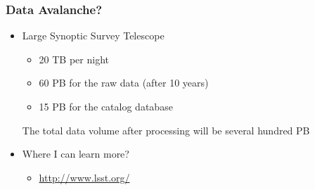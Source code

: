 \documentclass[fleqn]{beamer}
\begin{document}
  \begin{frame}\frametitle{Data Avalanche?}
  \begin{itemize}
    \item{Large Synoptic Survey Telescope}
      \begin{itemize}
        \item 20 TB per night
        \item 60 PB for the raw data (after 10 years)
        \item 15 PB for the catalog database
        

      \end{itemize}



        \small{The total data volume after processing will be
        several hundred PB}

          \bigskip

    \item{Where I can learn more?}
      \begin{itemize}
       \item \url{http://www.lsst.org/}
      \end{itemize}
  \end{itemize}
  \end{frame}
\end{document}
